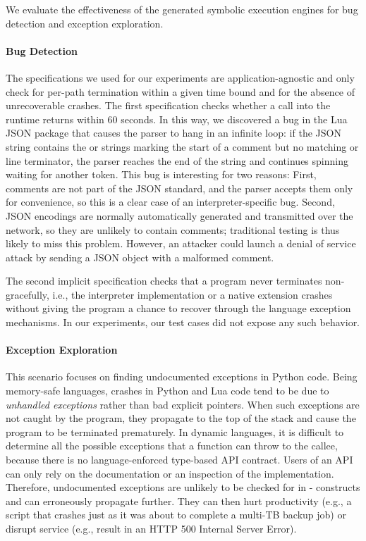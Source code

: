 We evaluate the effectiveness of the generated symbolic execution engines for bug detection and exception exploration.

\paragraph{Bug Detection}

The specifications we used for our experiments are application-agnostic and only check for per-path termination within a given time bound and for the absence of unrecoverable crashes.  The first specification checks whether a call into the runtime returns within 60 seconds.  In this way, we discovered a bug in the Lua JSON package that causes the parser to hang in an infinite loop: if the JSON string contains the \codebit{/*} or \codebit{//} strings marking the start of a comment but no matching \codebit{*/} or line terminator, the parser reaches the end of the string and continues spinning waiting for another token.
%
This bug is interesting for two reasons: First, comments are not part of the JSON standard, and the parser accepts them only for convenience, so this is a clear case of an interpreter-specific bug.  Second, JSON encodings are normally automatically generated and transmitted over the network, so they are unlikely to contain comments; traditional testing is thus likely to miss this problem. However, an attacker could launch a denial of service attack by sending a JSON object with a malformed comment.

The second implicit specification checks that a program never terminates non-gracefully, i.e., the interpreter implementation or a native extension crashes without giving the program a chance to recover through the language exception mechanisms.  In our experiments, our test cases did not expose any such behavior.

\paragraph{Exception Exploration}

This scenario focuses on finding undocumented exceptions in Python code.
%
Being memory-safe languages, crashes in Python and Lua code tend to be due to \emph{unhandled exceptions} rather than bad explicit pointers.  When such exceptions are not caught by the program, they propagate to the top of the stack and cause the program to be terminated prematurely. 
%
In dynamic languages, it is difficult to determine all the possible exceptions that a function can throw to the callee, because there is no language-enforced type-based API contract.  Users of an API can only rely on the documentation or an inspection of the implementation.  Therefore, undocumented exceptions are unlikely to be checked for in - constructs and can erroneously propagate further.
%
They can then hurt productivity (e.g., a script that crashes just as it was about to complete a multi-TB backup job) or disrupt service (e.g., result in an HTTP 500 Internal Server Error).

